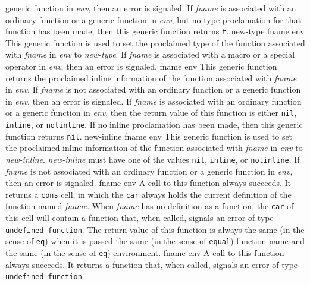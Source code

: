 generic function in \textit{env}, then an error is signaled.
\vskip -0.05cm
If \textit{fname} is associated with an ordinary function or a generic
function in \textit{env}, but no type proclamation for that function
has been made, then this generic function returns \texttt{t}.
\vskip -0.05cm
 {new-type fname env}
\vskip -0.2cm
This generic function is used to set the proclaimed type of the
function associated with \textit{fname} in \textit{env}
to \textit{new-type}.
\vskip -0.05cm
If \textit{fname} is associated with a macro or a special operator
in \textit{env}, then an error is signaled.
\vskip -0.05cm
 {fname env}
\vskip -0.2cm
This generic function returns the proclaimed inline information of
the function associated with \textit{fname} in \textit{env}.
\vskip -0.05cm
If \textit{fname} is not associated with an ordinary function or a
generic function in \textit{env}, then an error is signaled.
\vskip -0.05cm
If \textit{fname} is associated with an ordinary function or a
generic function in \textit{env}, then the return value of this
function is either \texttt{nil}, \texttt{inline}, or \texttt{notinline}.  If no inline
proclamation has been made, then this generic function returns
\texttt{nil}.
\vskip -0.05cm
 {new-inline fname env}
\vskip -0.2cm
This generic function is used to set the proclaimed inline
information of the function associated with \textit{fname} in
\textit{env} to \textit{new-inline}.
\vskip -0.05cm
\textit{new-inline} must have one of the values \texttt{nil}, \texttt{inline}, or
\texttt{notinline}.
\vskip -0.05cm
If \textit{fname} is not associated with an ordinary function or a
generic function in \textit{env}, then an error is signaled.
\vskip -0.05cm
 {fname env}
\vskip -0.2cm
A call to this function always succeeds.  It returns a \texttt{cons} cell,
in which the \texttt{car} always holds the current definition of the
function named \textit{fname}.  When \textit{fname} has no
definition as a function, the \texttt{car} of this cell will contain a
function that, when called, signals an error of type
\texttt{undefined-function}.  The return value of this function is always
the same (in the sense of \texttt{eq}) when it is passed the same (in the
sense of \texttt{equal}) function name and the same (in the sense of \texttt{eq})
environment.
\vskip -0.05cm
 {fname env}
\vskip -0.2cm
A call to this function always succeeds.  It returns a function
that, when called, signals an error of type \texttt{undefined-function}.
